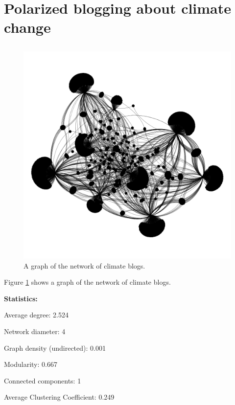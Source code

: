 \documentclass[11pt]{article}
\begin{document}
\section{Polarized blogging about climate change}
\subsection{}
\begin{figure}
  \includegraphics[width=\linewidth]{Figure_3.png}
  \caption{A graph of the network of climate blogs.}
  \label{fig:graph}
\end{figure}

Figure \ref{fig:graph} shows a graph of the network of climate blogs.

\textbf{}
\newline
\textbf{Statistics:} \hspace{0pt}

Average degree: \hfill 2.524

Network diameter: \hfill 4

Graph density (undirected): \hfill 0.001

Modularity: \hfill 0.667

Connected components: \hfill 1

Average Clustering Coefficient: \hfill 0.249
\end{document}
